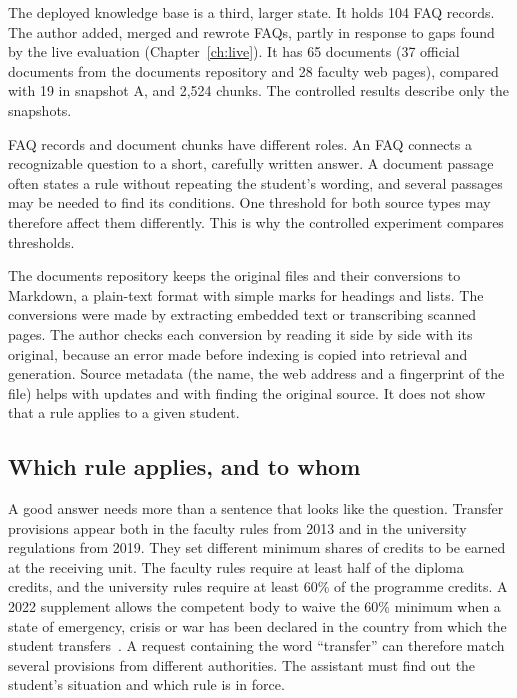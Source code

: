 The deployed knowledge base is a third, larger state. It holds 104 FAQ records. The author added, merged and rewrote FAQs, partly in response to gaps found by the live evaluation (Chapter~\ref{ch:live}). It has 65 documents (37 official documents from the documents repository and 28 faculty web pages), compared with 19 in snapshot A, and 2,524 chunks. The controlled results describe only the snapshots.

FAQ records and document chunks have different roles. An FAQ connects a recognizable question to a short, carefully written answer. A document passage often states a rule without repeating the student's wording, and several passages may be needed to find its conditions. One threshold for both source types may therefore affect them differently. This is why the controlled experiment compares thresholds.

The documents repository keeps the original files and their conversions to Markdown, a plain-text format with simple marks for headings and lists. The conversions were made by extracting embedded text or transcribing scanned pages. The author checks each conversion by reading it side by side with its original, because an error made before indexing is copied into retrieval and generation. Source metadata (the name, the web address and a fingerprint of the file) helps with updates and with finding the original source. It does not show that a rule applies to a given student.

\subsection{Which rule applies, and to whom}

A good answer needs more than a sentence that looks like the question. Transfer provisions appear both in the faculty rules from 2013 and in the university regulations from 2019. They set different minimum shares of credits to be earned at the receiving unit. The faculty rules require at least half of the diploma credits, and the university rules require at least 60\% of the programme credits. A 2022 supplement allows the competent body to waive the 60\% minimum when a state of emergency, crisis or war has been declared in the country from which the student transfers~\cite{finki2013study,ukim2019study,ukim2022supplement}. A request containing the word ``transfer'' can therefore match several provisions from different authorities. The assistant must find out the student's situation and which rule is in force.

